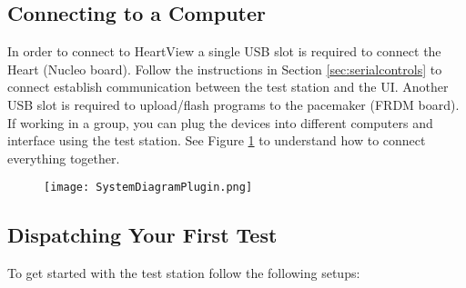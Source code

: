 \documentclass[11pt,fleqn]{book} %
\begin{document}
\subsection{Connecting to a Computer}

In order to connect to HeartView a single USB slot is required to connect the Heart (Nucleo board). Follow the instructions in Section \ref{sec:serialcontrols} to connect establish communication between the test station and the UI. Another USB slot is required to upload/flash programs to the pacemaker (FRDM board). If working in a group, you can plug the devices into different computers and interface using the test station. See Figure \ref{fig:system_plugin} to understand how to connect everything together.

\begin{figure}[h]
	\centering\texttt{[image: SystemDiagramPlugin.png]}
	\label{fig:system_plugin} %
\end{figure}


\subsection{Dispatching Your First Test}

To get started with the test station follow the following setups:\\
\end{document}
